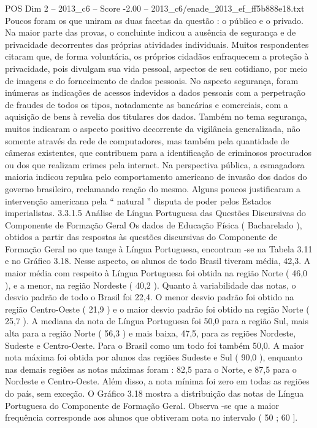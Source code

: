 \begin{textsample}{POS Dim 2 – 2013\_c6 – Score -2.00 – 2013\_c6/enade\_2013\_ef\_ff5b888e18.txt}
Poucos foram os que uniram as duas facetas da questão : o público e o privado.
Na maior parte das provas, o concluinte indicou a ausência de segurança e de privacidade decorrentes das próprias atividades individuais.
Muitos respondentes citaram que, de forma voluntária, os próprios cidadãos enfraquecem a proteção à privacidade, pois divulgam sua vida pessoal, aspectos de seu cotidiano, por meio de imagens e do fornecimento de dados pessoais.
No aspecto segurança, foram inúmeras as indicações de acessos indevidos a dados pessoais com a perpetração de fraudes de todos os tipos, notadamente as bancárias e comerciais, com a aquisição de bens à revelia dos titulares dos dados.
Também no tema segurança, muitos indicaram o aspecto positivo decorrente da vigilância generalizada, não somente através da rede de computadores, mas também pela quantidade de câmeras existentes, que contribuem para a identificação de criminosos procurados ou dos que realizam crimes pela internet.
Na perspectiva pública, a esmagadora maioria indicou repulsa pelo comportamento americano de invasão dos dados do governo brasileiro, reclamando reação do mesmo.
Alguns poucos justificaram a intervenção americana pela “ natural ” disputa de poder pelos Estados imperialistas. 3.3.1.5 Análise de Língua Portuguesa das Questões Discursivas do Componente de Formação Geral Os dados de Educação Física ( Bacharelado ), obtidos a partir das respostas às questões discursivas do Componente de Formação Geral no que tange à Língua Portuguesa, encontram -se na Tabela 3.11 e no Gráfico 3.18.
Nesse aspecto, os alunos de todo Brasil tiveram média, 42,3.
A maior média com respeito à Língua Portuguesa foi obtida na região Norte ( 46,0 ), e a menor, na região Nordeste ( 40,2 ).
Quanto à variabilidade das notas, o desvio padrão de todo o Brasil foi 22,4.
O menor desvio padrão foi obtido na região Centro-Oeste ( 21,9 ) e o maior desvio padrão foi obtido na região Norte ( 25,7 ).
A mediana da nota de Língua Portuguesa foi 50,0 para a região Sul, mais alta para a região Norte ( 56,3 ) e mais baixa, 47,5, para as regiões Nordeste, Sudeste e Centro-Oeste.
Para o Brasil como um todo foi também 50,0.
A maior nota máxima foi obtida por alunos das regiões Sudeste e Sul ( 90,0 ), enquanto nas demais regiões as notas máximas foram : 82,5 para o Norte, e 87,5 para o Nordeste e Centro-Oeste.
Além disso, a nota mínima foi zero em todas as regiões do país, sem exceção.
O Gráfico 3.18 mostra a distribuição das notas de Língua Portuguesa do Componente de Formação Geral.
Observa -se que a maior frequência corresponde aos alunos que obtiveram nota no intervalo ( 50 ; 60 ].

\end{textsample}
